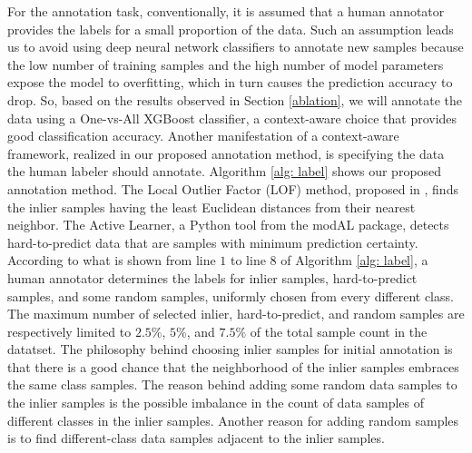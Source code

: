 \documentclass{article}
\begin{document}
For the annotation task, conventionally, it is assumed that a human annotator provides the labels for a small proportion of the data. Such an assumption leads us to avoid using deep neural network classifiers to annotate new samples because the low number of training samples and the high number of model parameters expose the model to overfitting, which in turn causes the prediction accuracy to drop. So, based on the results observed in Section \ref{ablation}, we will annotate the data using a One-vs-All XGBoost classifier, a context-aware choice that provides good classification accuracy. Another manifestation of a context-aware framework, realized in our proposed annotation method, is specifying the data the human labeler should annotate. Algorithm \ref{alg: label} shows our proposed annotation method. The Local Outlier Factor (LOF) method, proposed in \citep{Breunig}, finds the inlier samples having the least Euclidean distances from their nearest neighbor. The Active Learner, a Python tool from the modAL package, detects hard-to-predict data that are samples with minimum prediction certainty. According to what is shown from line $1$ to line $8$ of Algorithm \ref{alg: label}, a human annotator determines the labels for inlier samples, hard-to-predict samples, and some random samples, uniformly chosen from every different class. The maximum number of selected inlier, hard-to-predict, and random samples are respectively limited to $2.5\%$, $5\%$, and $7.5\%$ of the total sample count in the datatset. The philosophy behind choosing inlier samples for initial annotation is that there is a good chance that the neighborhood of the inlier samples embraces the same class samples. The reason behind adding some random data samples to the inlier samples is the possible imbalance in the count of data samples of different classes in the inlier samples. Another reason for adding random samples is to find different-class data samples adjacent to the inlier samples. 
\end{document}
